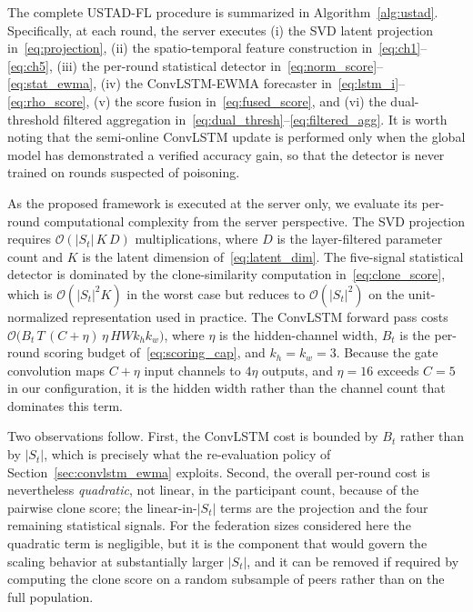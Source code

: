 \documentclass[journal]{IEEEtran}
\begin{document}
The complete USTAD-FL procedure is summarized in Algorithm~\ref{alg:ustad}. Specifically, at each round, the server executes (i) the SVD latent projection in~\eqref{eq:projection}, (ii) the spatio-temporal feature construction in~\eqref{eq:ch1}--\eqref{eq:ch5}, (iii) the per-round statistical detector in~\eqref{eq:norm_score}--\eqref{eq:stat_ewma}, (iv) the ConvLSTM-EWMA forecaster in~\eqref{eq:lstm_i}--\eqref{eq:rho_score}, (v) the score fusion in~\eqref{eq:fused_score}, and (vi) the dual-threshold filtered aggregation in~\eqref{eq:dual_thresh}--\eqref{eq:filtered_agg}. It is worth noting that the semi-online ConvLSTM update is performed only when the global model has demonstrated a verified accuracy gain, so that the detector is never trained on rounds suspected of poisoning.

As the proposed framework is executed at the server only, we evaluate its per-round computational complexity from the server perspective. The SVD projection requires $\mathcal{O}(|S_t|\,K\,D)$ multiplications, where $D$ is the layer-filtered parameter count and $K$ is the latent dimension of~\eqref{eq:latent_dim}. The five-signal statistical detector is dominated by the clone-similarity computation in~\eqref{eq:clone_score}, which is $\mathcal{O}(|S_t|^2 K)$ in the worst case but reduces to $\mathcal{O}(|S_t|^2)$ on the unit-normalized representation used in practice. The ConvLSTM forward pass costs $\mathcal{O}\bigl(B_t\,T\,(C + \eta)\,\eta\, H W k_h k_w\bigr)$, where $\eta$ is the hidden-channel width, $B_t$ is the per-round scoring budget of~\eqref{eq:scoring_cap}, and $k_h\!=\!k_w\!=\!3$. Because the gate convolution maps $C + \eta$ input channels to $4\eta$ outputs, and $\eta = 16$ exceeds $C = 5$ in our configuration, it is the hidden width rather than the channel count that dominates this term.

Two observations follow. First, the ConvLSTM cost is bounded by $B_t$ rather than by $|S_t|$, which is precisely what the re-evaluation policy of Section~\ref{sec:convlstm_ewma} exploits. Second, the overall per-round cost is nevertheless \emph{quadratic}, not linear, in the participant count, because of the pairwise clone score; the linear-in-$|S_t|$ terms are the projection and the four remaining statistical signals. For the federation sizes considered here the quadratic term is negligible, but it is the component that would govern the scaling behavior at substantially larger $|S_t|$, and it can be removed if required by computing the clone score on a random subsample of peers rather than on the full population.
\end{document}
